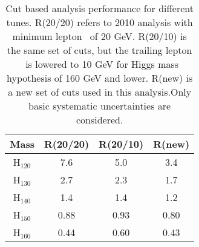 \begin{table}[!ht]
  \begin{center}
 {\small
  \begin{tabular} {|c|c|c|c|}
  \hline
  Mass   &  R(20/20) & R(20/10) & R(new) \\
  \hline
  \hline
  H$_{120}$ & 7.6 & 5.0 & 3.4 \\
  H$_{130}$ & 2.7 & 2.3 & 1.7 \\
  H$_{140}$ & 1.4 & 1.4 & 1.2 \\
  H$_{150}$ & 0.88 & 0.93 & 0.80 \\
  H$_{160}$ & 0.44 & 0.60 & 0.43 \\
  \hline
  \hline
  \end{tabular}
  }
  \caption{Cut based analysis performance for different tunes. R(20/20) refers 
  to 2010 analysis with minimum lepton \pt\ of 20 GeV. R(20/10) is the same set of cuts,
  but the trailing lepton \pt\ is lowered to 10 GeV for Higgs mass hypothesis 
  of 160 GeV and lower. R(new) is a new set of cuts used in this analysis.Only 
  basic systematic uncertainties are considered.}
   \label{tab:cutanalysis_perf}
  \end{center}
\end{table}


